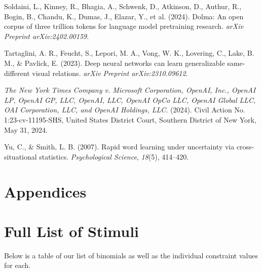\documentclass[
  nottoc]{article}
\newlength{\cslhangindent}
\newenvironment{CSLReferences}[2] %
 {\begin{list}{}{%
  \setlength{\itemindent}{0pt}
  \setlength{\leftmargin}{0pt}
  \setlength{\parsep}{0pt}
  \ifodd #1
   \setlength{\leftmargin}{\cslhangindent}
   \setlength{\itemindent}{-1\cslhangindent}
  \fi
  \setlength{\itemsep}{#2\baselineskip}}}
 {\end{list}}
\begin{document}
\begin{CSLReferences}{1}{0}
Soldaini, L., Kinney, R., Bhagia, A., Schwenk, D., Atkinson, D., Authur,
R., Bogin, B., Chandu, K., Dumas, J., Elazar, Y., et al. (2024). Dolma:
An open corpus of three trillion tokens for language model pretraining
research. \emph{arXiv Preprint arXiv:2402.00159}.

Tartaglini, A. R., Feucht, S., Lepori, M. A., Vong, W. K., Lovering, C.,
Lake, B. M., \& Pavlick, E. (2023). Deep neural networks can learn
generalizable same-different visual relations. \emph{arXiv Preprint
arXiv:2310.09612}.

\emph{{The New York Times Company v. Microsoft Corporation, OpenAI,
Inc., OpenAI LP, OpenAI GP, LLC, OpenAI, LLC, OpenAI OpCo LLC, OpenAI
Global LLC, OAI Corporation, LLC, and OpenAI Holdings, LLC}}. (2024).
Civil Action No. 1:23-cv-11195-SHS, United States District Court,
Southern District of New York, May 31, 2024.

Yu, C., \& Smith, L. B. (2007). Rapid word learning under uncertainty
via cross-situational statistics. \emph{Psychological Science},
\emph{18}(5), 414--420.

\end{CSLReferences}

\newpage

\section*{Appendices}\label{appendices}

\appendix

\renewcommand{\thesection}{\Alph{section}}

\setcounter{section}{0}



\section{Full List of Stimuli}\label{sec-full-list-of-stimuli}

Below is a table of our list of binomials as well as the individual
constraint values for each.
\end{document}
